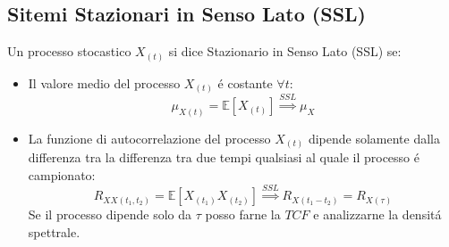     \subsection{Sitemi Stazionari in Senso Lato (SSL)}
        Un processo stocastico $X_{(t)}$ si dice Stazionario in Senso Lato (SSL) se:
        \begin{itemize}
            \item {Il valore medio del processo $X_{(t)}$ é costante $\forall t$:
                \[
                    \mu_{X(t)} = \mathbb{E}[X_{(t)}] \overset{SSL}{\Rightarrow} \mu_{X}    
                \]
            }
            \item {La funzione di autocorrelazione del processo $X_{(t)}$ dipende solamente dalla differenza tra la differenza 
                tra due tempi qualsiasi al quale il processo é campionato:
                \[
                    R_{XX(t_1,t_2)} = \mathbb{E}[X_{(t_1)}X_{(t_2)}] \overset{SSL}{\Rightarrow} R_{X(t_1-t_2)} = R_{X(\tau)}      
                \]
                Se il processo dipende solo da $\tau$ posso farne la $TCF$ e analizzarne la densitá spettrale. 
                }
        \end{itemize} 
